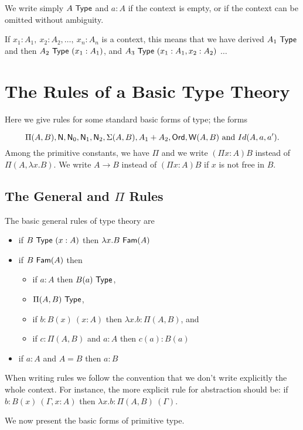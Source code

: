 { We write simply $A~{\sf Type}$ and $a:A$ if the context is empty, or if the context
can be omitted without ambiguity.

 If $x_1:A_1,~x_2:A_2,\dots,~x_n:A_n$ is a context, this means that we have
derived $A_1~{\sf Type}$ and then $A_2~{\sf Type}~(x_1:A_1)$, and $A_3~{\sf Type}~(x_1:A_1,x_2:A_2)$
$\dots$

\medskip

\section*{The Rules of a Basic Type Theory}
Here we give rules for some standard basic forms of type; the forms 

  $$\Pi(A,B),{\sf N},{\sf N}_0,{\sf N}_1,{\sf N}_2,\Sigma(A,B),A_1+A_2,{\sf Ord},{\sf W}(A,B)
    \mbox{ and }Id(A,a,a').$$
%
Among the primitive constants, we have $\Pi$ and we write $(\Pi x:A)B$ instead
of $\Pi(A,\lambda x.B)$. We write $A\rightarrow B$ instead of $(\Pi x:A)B$ if
$x$ is not free in $B$.

\medskip

\subsection{The General and $\Pi$ Rules}
 The basic general rules of type theory are 
\begin{itemize}
\item if $B~{\sf Type}~(x:A)$ then $\lambda x.B~{\sf Fam}(A)$
\item if $B~{\sf Fam}(A)$ then 
\begin{itemize}
\item if $a:A$ then $B(a)~{\sf Type}$,
\item $\Pi(A,B)~{\sf Type}$,
\item if $b:B(x)~(x:A)$ then $\lambda x.b:\Pi(A,B)$, and
\item if $c:\Pi(A,B)$ and $a:A$ then $c(a):B(a)$
\end{itemize}
\item if $a:A$ and $A= B$ then $a:B$
\end{itemize}

\medskip

 When writing rules we follow the convention that we don't write explicitly the whole context.  For instance, the more explicit rule for abstraction should be: if $b:B(x)~(\Gamma,x:A)$ then $\lambda x.b:\Pi(A,B)~(\Gamma)$.

\medskip

We now present the basic forms of primitive type.  

}
